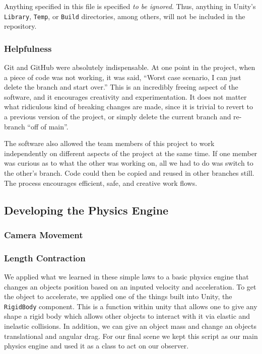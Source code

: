 \documentclass[12pt]{article}
\begin{document}
\inputminted[firstline=0,lastline=10,linenos,fontsize=\footnotesize,bgcolor=codebg]{text}{../.gitignore}

Anything specified in this file is specified \emph{to be ignored}. Thus, anything in Unity's \texttt{Library}, \texttt{Temp}, or \texttt{Build} directories, among others, will not be included in the repository.

\subsubsection{Helpfulness}
Git and GitHub were absolutely indispensable. At one point in the project, when a piece of code was not working, it was said, \enquote{Worst case scenario, I can just delete the branch and start over.} This is an incredibly freeing aspect of the software, and it encourages creativity and experimentation. It does not matter what ridiculous kind of breaking changes are made, since it is trivial to revert to a previous version of the project, or simply delete the current branch and re-branch \enquote{off of main}.

The software also allowed the team members of this project to work independently on different aspects of the project at the same time. If one member was curious as to what the other was working on, all we had to do was switch to the other's branch. Code could then be copied and reused in other branches still. The process encourages efficient, safe, and creative work flows.  


\subsection{Developing the Physics Engine}

\subsubsection{Camera Movement}

\subsubsection{Length Contraction}
We applied what we learned in these simple laws to a basic physics engine that changes an objects position based on an inputed velocity and acceleration. To get the object to accelerate, we applied one of the things built into Unity, the \texttt{RigidBody} component. This is a function within unity that allows one to give any shape a rigid body which allows other objects to interact with it via elastic and inelastic collisions. In addition, we can give an object mass and change an objects translational and angular drag. For our final scene we kept this script as our main physics engine and used it as a class to act on our observer. 
\end{document}
